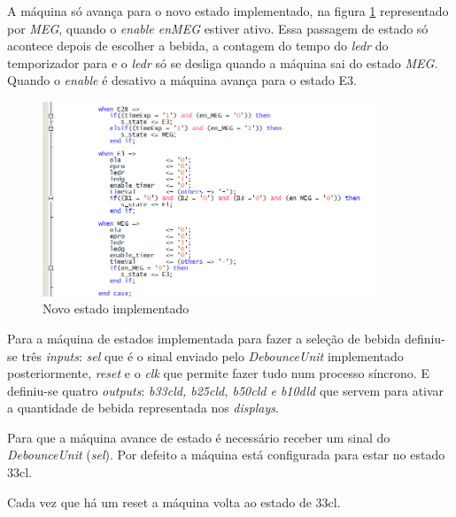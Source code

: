 \documentclass{report}
\begin{document}
A máquina só avança para o novo estado implementado, na figura \ref{fig:FSMFase2} representado por \textit{MEG}, quando o \textit{enable en\textunderscore MEG} estiver ativo. Essa passagem de estado só acontece depois de escolher a bebida, a contagem do tempo do \textit{ledr} do temporizador para e o \textit{ledr} só se desliga quando a máquina sai do estado \textit{MEG}. Quando o \textit{enable} é desativo a máquina avança para o estado E3.

\begin{figure}[H]
    \centering
    \includegraphics[width = 10cm]{Fase2FSM.png}
    \caption{Novo estado implementado}
    \label{fig:FSMFase2}
\end{figure}

Para a máquina de estados implementada para fazer a seleção de bebida definiu-se três \textit{inputs}: \textit{sel} que é o sinal enviado pelo \textit{DebounceUnit} implementado posteriormente, \textit{reset} e o \textit{clk} que permite fazer tudo num processo síncrono. E definiu-se quatro \textit{outputs}: \textit{b33cl\textunderscore d, b25cl\textunderscore d, b50cl\textunderscore d e b10dl\textunderscore d} que servem para ativar a quantidade de bebida representada nos \textit{displays}.

Para que a máquina avance de estado é necessário receber um sinal do \textit{DebounceUnit} (\textit{sel}). Por defeito a máquina está configurada para estar no estado 33cl.

Cada vez que há um reset a máquina volta ao estado de 33cl.
\end{document}

